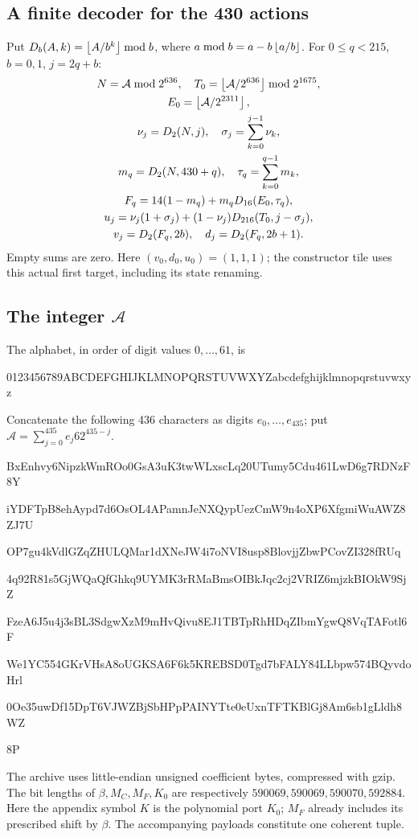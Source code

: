 \subsection*{A finite decoder for the 430 actions}
Put $D_b(A,k)=\left\lfloor A/b^k\right\rfloor\bmod b$, where
$a\bmod b=a-b\left\lfloor a/b\right\rfloor$. For $0\le q<215$, $b=0,1$, $j=2q+b$:
\[
\begin{gathered}
N=\mathcal A\bmod2^{636},\quad
T_0=\left\lfloor\mathcal A/2^{636}\right\rfloor\bmod2^{1675},\\
E_0=\left\lfloor\mathcal A/2^{2311}\right\rfloor,\\
\nu_j=D_2(N,j),\quad \sigma_j=\sum_{k=0}^{j-1}\nu_k,\\
m_q=D_2(N,430+q),\quad \tau_q=\sum_{k=0}^{q-1}m_k,\\
F_q=14(1-m_q)+m_qD_{16}(E_0,\tau_q),\\
u_j=\nu_j(1+\sigma_j)+(1-\nu_j)D_{216}(T_0,j-\sigma_j),\\
v_j=D_2(F_q,2b),\quad d_j=D_2(F_q,2b+1).
\end{gathered}
\]
Empty sums are zero. Here $(v_0,d_0,u_0)=(1,1,1)$; the constructor tile
uses this actual first target, including its state renaming.

\subsection*{The integer $\mathcal A$}
The alphabet, in order of digit values $0,\ldots,61$, is
\begin{center}\small\ttfamily
0123456789ABCDEFGHIJKLMNOPQRSTUVWXYZabcdefghijklmnopqrstuvwxyz
\end{center}
Concatenate the following 436 characters as digits $e_0,\ldots,e_{435}$;
put $\mathcal A=\sum_{j=0}^{435}e_j62^{435-j}$.\par
\begingroup\small\ttfamily
BxEnhvy6NipzkWmROo0GsA3uK3twWLxscLq20UTumy5Cdu461LwD6g7RDNzF8Y\par
iYDFTpB8ehAypd7d6OsOL4APamnJeNXQypUezCmW9n4oXP6XfgmiWuAWZ8ZJ7U\par
OP7gu4kVdlGZqZHULQMar1dXNeJW4i7oNVI8usp8BlovjjZbwPCovZI328fRUq\par
4q92R81s5GjWQaQfGhkq9UYMK3rRMaBmsOIBkJqc2cj2VRIZ6mjzkBIOkW9SjZ\par
FzeA6J5u4j3sBL3SdgwXzM9mHvQivu8EJ1TBTpRhHDqZIbmYgwQ8VqTAFotl6F\par
We1YC554GKrVHsA8oUGKSA6F6k5KREBSD0Tgd7bFALY84LLbpw574BQyvdoHrl\par
0Oe35uwDf15DpT6VJWZBjSbHPpPAINYTte0eUxnTFTKBlGj8Am6sb1gLldh8WZ\par
8P\par
\endgroup

The archive uses little-endian unsigned coefficient bytes, compressed with gzip. The bit lengths of $\beta,M_C,M_F,K_0$ are respectively $590069,590069,590070,592884$. Here the appendix symbol $K$ is the polynomial port $K_0$; $M_F$ already includes its prescribed shift by $\beta$. The accompanying payloads constitute one coherent tuple.
